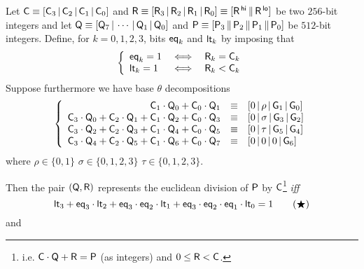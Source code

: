 \begin{lem}
	Let
	$\mathsf{C}\equiv [\mathsf{C}_{3} \,|\, \mathsf{C}_{2} \,|\, \mathsf{C}_{1} \,|\, \mathsf{C}_{0}]$ and 
	$\mathsf{R}
	\equiv [\mathsf{R}_{3} \,|\, \mathsf{R}_{2} \,|\, \mathsf{R}_{1} \,|\, \mathsf{R}_{0}]
	\equiv [\mathsf{R}^{\mathsf{\,hi}} \,\|\, \mathsf{R}^{\mathsf{\,lo}}]$ be two $256$-bit integers and let
	$\mathsf{Q}\equiv [
		\mathsf{Q}_{7} \,|\, \cdots \,|\, \mathsf{Q}_{1} \,|\, \mathsf{Q}_{0}]$
	and
	$\mathsf{P}\equiv [\mathsf{P}_{3} \,\|\, \mathsf{P}_{2} \,\|\, \mathsf{P}_{1} \,\|\, \mathsf{P}_{0}]$ be $512$-bit integers.
	Define, for $k = 0, 1, 2, 3$, bits
	$\mathsf{eq}_{k}$ and
	$\mathsf{lt}_{k}$ by imposing that
	\[
		\left\{ \begin{array}{lcc}
			\mathsf{eq}_{k} = 1	& \iff & \mathsf{R}_{k} = \mathsf{C}_{k}\\
			\mathsf{lt}_{k} = 1	& \iff & \mathsf{R}_{k} < \mathsf{C}_{k}\\
		\end{array} \right.
	\]
	Suppose furthermore we have base $\theta$ decompositions
	\[
		\left\{ \begin{array}{rcl}
			\mathsf{C}_{1} \cdot \mathsf{Q}_{0}
			+ \mathsf{C}_{0} \cdot \mathsf{Q}_{1}
			& \equiv & [0 \,|\, \rho \,|\, \mathsf{G}_{1} \,|\, \mathsf{G}_{0}] \\
			\mathsf{C}_{3} \cdot \mathsf{Q}_{0}
			+ \mathsf{C}_{2} \cdot \mathsf{Q}_{1}
			+ \mathsf{C}_{1} \cdot \mathsf{Q}_{2}
			+ \mathsf{C}_{0} \cdot \mathsf{Q}_{3}
			& \equiv & [0 \,|\, \sigma \,|\, \mathsf{G}_{3} \,|\, \mathsf{G}_{2}] \\
			\mathsf{C}_{3} \cdot \mathsf{Q}_{2}
			+ \mathsf{C}_{2} \cdot \mathsf{Q}_{3}
			+ \mathsf{C}_{1} \cdot \mathsf{Q}_{4}
			+ \mathsf{C}_{0} \cdot \mathsf{Q}_{5}
			& \equiv & [0 \,|\, \tau \,|\, \mathsf{G}_{5} \,|\, \mathsf{G}_{4}] \\
			\mathsf{C}_{3} \cdot \mathsf{Q}_{4}
			+ \mathsf{C}_{2} \cdot \mathsf{Q}_{5}
			+ \mathsf{C}_{1} \cdot \mathsf{Q}_{6}
			+ \mathsf{C}_{0} \cdot \mathsf{Q}_{7}
			& \equiv & [0 \,|\, 0 \,|\, 0 \,|\, \mathsf{G}_{6}] \\
		\end{array} \right.
	\]
	where $\rho \in \{ 0, 1\}$ $\sigma \in \{ 0, 1, 2, 3\}$ $\tau \in \{ 0, 1, 2, 3\}$.

	Then the pair $(\mathsf{Q}, \mathsf{R})$ represents the euclidean division of $\mathsf{P}$ by $\mathsf{C}$\footnote{i.e. $\mathsf{C} \cdot \mathsf{Q} + \mathsf{R} = \mathsf{P}$ (as integers) and $0 \leq \mathsf{R} < \mathsf{C}$.} \emph{iff}
	\[
		\mathsf{lt}_{3}
		+
		\mathsf{eq}_{3} \cdot \mathsf{lt}_{2}
		+
		\mathsf{eq}_{3} \cdot \mathsf{eq}_{2} \cdot \mathsf{lt}_{1}
		+
		\mathsf{eq}_{3} \cdot \mathsf{eq}_{2} \cdot \mathsf{eq}_{1} \cdot \mathsf{lt}_{0}
		=
		1
		\tag{$\bigstar$}
	\]
	and
\end{lem}
